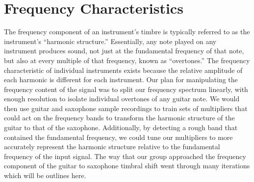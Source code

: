 \documentclass[12pt]{article}
\begin{document}
\section{Frequency Characteristics}
The frequency component of an instrument's timbre is typically referred to as the instrument's ``harmonic structure.'' Essentially, any note played on any instrument produces sound, not just at the fundamental frequency of that note, but also at every multiple of that frequency, known as ``overtones.'' The frequency characteristic of individual instruments exists because the relative amplitude of each harmonic is different for each instrument.
\newline\newline
Our plan for manipulating the frequency content of the signal was to split our frequency spectrum linearly, with enough resolution to isolate individual overtones of any guitar note. We would then use guitar and saxophone sample recordings to train sets of multipliers that could act on the frequency bands to transform the harmonic structure of the guitar to that of the saxophone. Additionally, by detecting a rough band that contained the fundamental frequency, we could tune our multipliers to more accurately represent the harmonic structure relative to the fundamental frequency of the input signal.
\newline\newline
The way that our group approached the frequency component of the guitar to saxophone timbral shift went through many iterations which will be outlines here.
\end{document}

